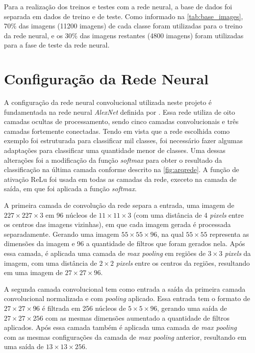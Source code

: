 \par Para a realização dos treinos e testes com a rede neural, a base de dados foi separada em dados de treino e de teste. Como informado na \autoref{tab:base_images}, 70\% das imagens (11200 imagens) de cada classe foram utilizadas para o treino da rede neural, e os 30\% das imagens restantes (4800 imagens) foram utilizadas para a fase de teste da rede neural.




\section{Configuração da Rede Neural}

A configuração da rede neural convolucional utilizada neste projeto é fundamentada na rede neural \textit{AlexNet} definida por . Essa rede utiliza de oito camadas ocultas de processamento, sendo cinco camadas convolucionais e três camadas fortemente conectadas. Tendo em vista que a rede escolhida como exemplo foi estruturada para classificar mil classes, foi necessário fazer algumas adaptações para classificar uma quantidade menor de classes. Uma dessas alterações foi a modificação da função \textit{softmax} para obter o resultado da classificação na última camada conforme descrito na \autoref{fig:arqrede}. A função de ativação ReLu foi usada em todas as camadas da rede, execeto na camada de saída, em que foi aplicada a função \textit{softmax}.

\par A primeira camada de convolução da rede separa a entrada, uma imagem de $227\times227\times3$ em 96 núcleos de $11\times11\times3$ (com uma distância de 4 \textit{pixels} entre os centros das imagens vizinhas), em que cada imagem gerada é processada separadamente. 
Gerando uma imagem $55\times55\times96$, na qual $55\times55$ representa as dimensões da imagem e 96 a quantidade de filtros que foram gerados nela. Após essa camada, é aplicada uma camada de \textit{max pooling} em regiões de $3\times3$ \textit{pixels} da imagem, com uma distância de $2\times2$ \textit{pixels} entre os centros da regiões, resultando em uma imagem de $27\times27\times96$.

\par A segunda camada convolucional tem como entrada a saída da primeira camada convolucional normalizada e com \textit{pooling} aplicado. Essa entrada tem o formato de $27\times27\times96$ é filtrada em 256 núcleos de $5\times5\times96$, gerando uma saída de $27\times27\times256$ com as mesmas dimensões aumentado a quantidade de filtros aplicados. Após essa camada também é aplicada uma camada de \textit{max pooling} com as mesmas configurações da camada de \textit{max pooling} anterior, resultando em uma saída de $13\times13\times256$.

